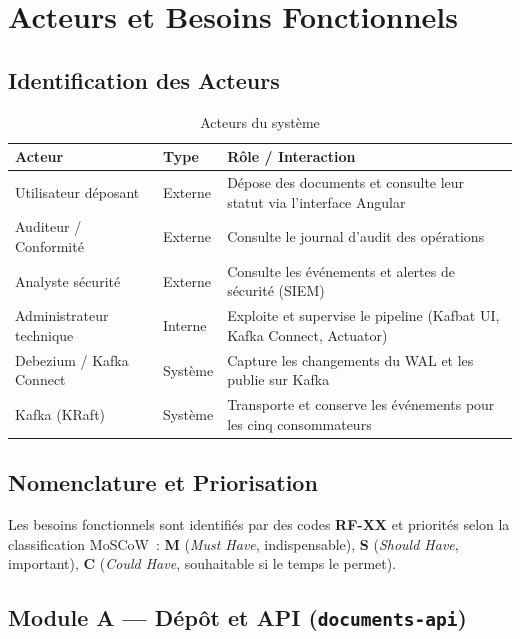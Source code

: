 \documentclass[12pt,a4paper,openany]{report}
\begin{document}
    \chapter{Acteurs et Besoins Fonctionnels}

    \section{Identification des Acteurs}

    \begin{table}[H]
    \centering
    \begin{tabularx}{\textwidth}{llX}
    \toprule
    \textbf{Acteur} & \textbf{Type} & \textbf{R\^ole / Interaction} \\
    \midrule
    Utilisateur d\'eposant   & Externe & D\'epose des documents et consulte leur statut via l'interface Angular \\
    Auditeur / Conformit\'e  & Externe & Consulte le journal d'audit des op\'erations \\
    Analyste s\'ecurit\'e    & Externe & Consulte les \'ev\'enements et alertes de s\'ecurit\'e (SIEM) \\
    Administrateur technique & Interne & Exploite et supervise le pipeline (Kafbat UI, Kafka Connect, Actuator) \\
    Debezium / Kafka Connect & Syst\`eme & Capture les changements du WAL et les publie sur Kafka \\
    Kafka (KRaft)            & Syst\`eme & Transporte et conserve les \'ev\'enements pour les cinq consommateurs \\
    \bottomrule
    \end{tabularx}
    \caption{Acteurs du syst\`eme}
    \end{table}

    \section{Nomenclature et Priorisation}

    Les besoins fonctionnels sont identifi\'es par des codes \textbf{RF-XX} et priorit\'es selon la classification MoSCoW~: \textbf{M} (\textit{Must Have}, indispensable), \textbf{S} (\textit{Should Have}, important), \textbf{C} (\textit{Could Have}, souhaitable si le temps le permet).

    \section{Module A --- D\'ep\^ot et API (\texttt{documents-api})}
\end{document}
